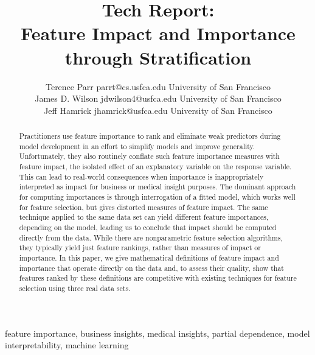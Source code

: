 \documentclass[11pt]{article}
\newcommand{\todo}[1]{{{\small\color{red}{[#1]}}}}
\begin{document}
\def\spacingset#1{\renewcommand{\baselinestretch}%
{#1}\small\normalsize} \spacingset{1}



\title{\bf Tech Report:\\
Feature Impact and Importance through Stratification}

\author{Terence Parr \email parrt@cs.usfca.edu
\addr University of San Francisco\\
\AND James D. Wilson \email jdwilson4@usfca.edu
\addr University of San Francisco\\
\AND Jeff Hamrick \email jhamrick@usfca.edu
      \addr University of San Francisco}

\maketitle

\begin{abstract}%
Practitioners use feature importance to rank and eliminate weak predictors during model development in an effort to simplify models and improve generality.  Unfortunately, they also routinely conflate such feature importance measures with feature impact, the isolated effect of an explanatory variable on the response variable.   This can lead to real-world consequences when importance is inappropriately interpreted as impact for business or medical insight purposes. The dominant approach for computing importances is through interrogation of a fitted model, which works well for feature selection, but gives distorted measures of feature impact. The same technique applied to the same data set can yield different feature importances, depending on the model, leading us to conclude that impact should be computed directly from the data.  While there are nonparametric feature selection algorithms, they typically yield just feature rankings, rather than measures of impact or importance. In this paper, we give mathematical definitions of feature impact and importance that operate directly on the data and, to assess their quality, show that features ranked by these definitions are competitive with existing techniques for feature selection using three real data sets. \todo{should we reference shap, permutation importance, mRMR in abstract?}
\end{abstract}

\begin{keywords}
feature importance, business insights, medical insights, partial dependence, model interpretability, machine learning
\end{keywords}
\end{document}
